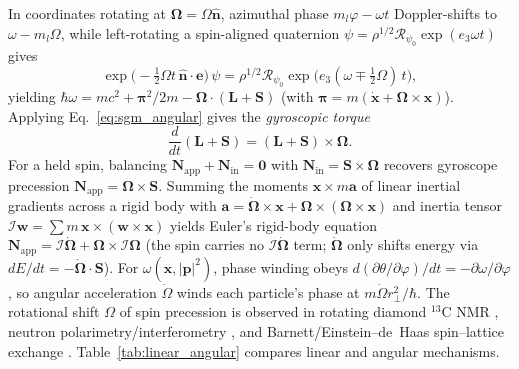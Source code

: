 \documentclass[aps,prd,onecolumn,tightenlines,nofootinbib,notitlepage,10pt,floatfix]{revtex4-2}
\theoremstyle{indentedtheorem}
\begin{document}
In coordinates rotating at $\boldsymbol{\Omega}=\Omega\hat{\mathbf{n}}$, azimuthal phase $m_l\varphi-\omega t$ Doppler-shifts to $\omega-m_l\Omega$, while left-rotating a spin-aligned quaternion $\psi=\rho^{1/2}\mathcal{R}_{\psi_0}\exp(e_3\omega t)$ gives
\begin{equation}
    \exp\big(-\tfrac{1}{2}\Omega t\,\hat{\mathbf{n}}\cdot\mathbf{e}\big)\,\psi = \rho^{1/2}\mathcal{R}_{\psi_0}\exp\big(e_3(\omega\mp\tfrac{1}{2}\Omega)\,t\big) ,
    \label{eq:spin_doppler}
\end{equation}
yielding $\hbar\omega=mc^2+\boldsymbol{\pi}^2/2m-\boldsymbol{\Omega}\cdot(\mathbf{L}+\mathbf{S})$ (with $\boldsymbol{\pi}=m(\dot{\mathbf{x}}+\boldsymbol{\Omega}\times\mathbf{x})$). Applying Eq.~\eqref{eq:sgm_angular} gives the \emph{gyroscopic torque}
\begin{equation}
    \frac{d}{dt}(\mathbf{L}+\mathbf{S}) = (\mathbf{L}+\mathbf{S})\times\boldsymbol{\Omega} .
    \label{eq:gyroscopic}
\end{equation}
For a held spin, balancing $\mathbf{N}_\text{app}+\mathbf{N}_\text{in}=\mathbf{0}$ with $\mathbf{N}_\text{in}=\mathbf{S}\times\boldsymbol{\Omega}$ recovers gyroscope precession $\mathbf{N}_\text{app}=\boldsymbol{\Omega}\times\mathbf{S}$. Summing the moments $\mathbf{x}\times m\mathbf{a}$ of linear inertial gradients across a rigid body with $\mathbf{a}=\dot{\boldsymbol{\Omega}}\times\mathbf{x}+\boldsymbol{\Omega}\times(\boldsymbol{\Omega}\times\mathbf{x})$ and inertia tensor $\mathcal{I}\mathbf{w}=\sum m\,\mathbf{x}\times(\mathbf{w}\times\mathbf{x})$ yields Euler's rigid-body equation $\mathbf{N}_\text{app}=\mathcal{I}\dot{\boldsymbol{\Omega}}+\boldsymbol{\Omega}\times\mathcal{I}\boldsymbol{\Omega}$ \citep{Goldstein2002Classical} (the spin carries no $\mathcal{I}\dot{\boldsymbol{\Omega}}$ term; $\dot{\boldsymbol{\Omega}}$ only shifts energy via $dE/dt=-\dot{\boldsymbol{\Omega}}\cdot\mathbf{S}$). For $\omega(\mathbf{x},|\mathbf{p}|^2)$, phase winding obeys $d(\partial\theta/\partial\varphi)/dt=-\partial\omega/\partial\varphi$, so angular acceleration $\dot{\Omega}$ winds each particle's phase at $m\dot{\Omega}r_\perp^2/\hbar$. The rotational shift $\Omega$ of spin precession is observed in rotating diamond $^{13}$C NMR \citep{Wood2017Magnetic}, neutron polarimetry/interferometry \citep{Demirel2015Measurement,Danner2020Spin,Werner1979Effect}, and Barnett/Einstein--de~Haas spin--lattice exchange \citep{Barnett1915,EinsteinDeHaas1915Experimental}. Table~\ref{tab:linear_angular} compares linear and angular mechanisms.
\end{document}
